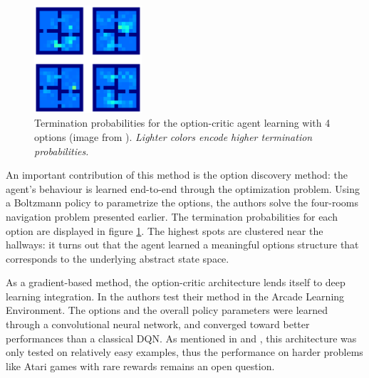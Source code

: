 \documentclass{article}
\begin{document}
\begin{figure}
    \centering
    \includegraphics[width=4cm]{images/option-critic-4room.png}
    \caption{Termination probabilities for the option-critic
agent learning with 4 options (image from \cite{bacon_option-critic_2016}). \small \it Lighter colors encode higher termination probabilities.}
    \label{fig:opt-crit}
    \vspace{-1cm}
\end{figure}

An important contribution of this method is the option discovery method: the agent's behaviour is learned end-to-end through the optimization problem. Using a Boltzmann policy to parametrize the options, the authors solve the four-rooms navigation problem presented earlier. The termination probabilities for each option are displayed in figure \ref{fig:opt-crit}. The highest spots are clustered near the hallways: it turns out that the agent learned a meaningful options structure that corresponds to the underlying abstract state space.

As a gradient-based method, the option-critic architecture lends itself to deep learning integration. In \cite{bacon_option-critic_2016} the authors test their method in the Arcade Learning Environment. The options and the overall policy parameters were learned through a convolutional neural network, and converged toward better performances than a classical DQN.
As mentioned in \cite{alexander_strategic_2016} and \cite{vezhnevets_feudal_2017}, this architecture was only tested on relatively easy examples, thus the performance on harder problems like Atari games with rare rewards remains an open question.

\end{document}
